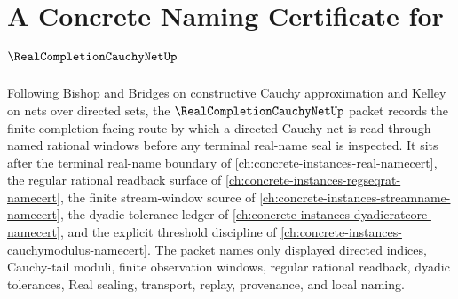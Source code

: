 \chapter{A Concrete Naming Certificate for $\RealCompletionCauchyNetUp$}
\label{ch:concrete-instances-real-completion-cauchy-net-namecert}

Following Bishop and Bridges on constructive Cauchy approximation and Kelley on nets over directed sets, the $\RealCompletionCauchyNetUp$ packet records the finite completion-facing route by which a directed Cauchy net is read through named rational windows before any terminal real-name seal is inspected. It sits after the terminal real-name boundary of \autoref{ch:concrete-instances-real-namecert}, the regular rational readback surface of \autoref{ch:concrete-instances-regseqrat-namecert}, the finite stream-window source of \autoref{ch:concrete-instances-streamname-namecert}, the dyadic tolerance ledger of \autoref{ch:concrete-instances-dyadicratcore-namecert}, and the explicit threshold discipline of \autoref{ch:concrete-instances-cauchymodulus-namecert}. The packet names only displayed directed indices, Cauchy-tail moduli, finite observation windows, regular rational readback, dyadic tolerances, Real sealing, transport, replay, provenance, and local naming.

